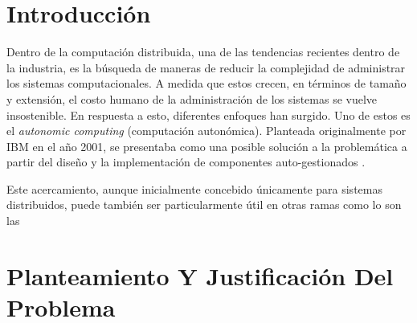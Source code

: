 \documentclass[12pt]{article}
\begin{document}
    
    
    \section{Introducción}


    Dentro de la computación distribuida, una de las tendencias recientes dentro de la industria, es la búsqueda de maneras de reducir la complejidad de administrar los sistemas computacionales. A medida que estos crecen, en términos de tamaño y extensión, el costo humano de la administración de los sistemas se vuelve insostenible. En respuesta a esto, diferentes enfoques han surgido. Uno de estos es el \textit{autonomic computing} (computación autonómica). Planteada originalmente por IBM en el año 2001, se presentaba como una posible solución a la problemática a partir del diseño y la implementación de componentes auto-gestionados \cite{jeff_2011}. 


    Este acercamiento, aunque inicialmente concebido únicamente para sistemas distribuidos, puede también ser particularmente útil en otras ramas como lo son las 


    \pagebreak

    \section{Planteamiento Y Justificación Del Problema}
    
    
\end{document}
